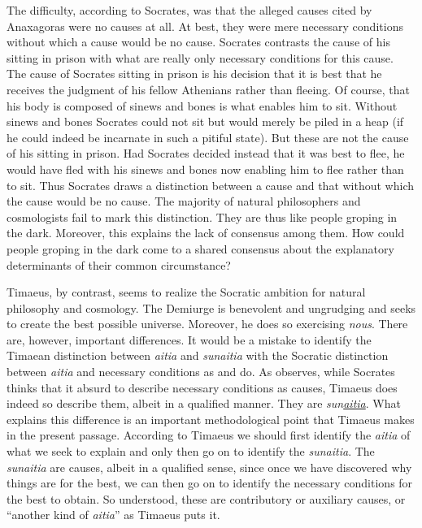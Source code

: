 The difficulty, according to Socrates, was that the alleged causes cited by Anaxagoras were no causes at all. At best, they were mere necessary conditions without which a cause would be no cause. Socrates contrasts the cause of his sitting in prison with what are really only necessary conditions for this cause. The cause of Socrates sitting in prison is his decision that it is best that he receives the judgment of his fellow Athenians rather than fleeing. Of course, that his body is composed of sinews and bones is what enables him to sit. Without sinews and bones Socrates could not sit but would merely be piled in a heap (if he could indeed be incarnate in such a pitiful state). But these are not the cause of his sitting in prison. Had Socrates decided instead that it was best to flee, he would have fled with his sinews and bones now enabling him to flee rather than to sit. Thus Socrates draws a distinction between a cause and that without which the cause would be no cause. The majority of natural philosophers and cosmologists fail to mark this distinction. They are thus like people groping in the dark. Moreover, this explains the lack of consensus among them. How could people groping in the dark come to a shared consensus about the explanatory determinants of their common circumstance?

Timaeus, by contrast, seems to realize the Socratic ambition for natural philosophy and cosmology. The Demiurge is benevolent and ungrudging and seeks to create the best possible universe. Moreover, he does so exercising \emph{nous}. There are, however, important differences. It would be a mistake to identify the Timaean distinction between \emph{aitia} and \emph{sunaitia} with the Socratic distinction between \emph{aitia} and necessary conditions as \citet[106]{Burnet:1911aa} and \citet[303]{Taylor:1928qb} do. As \citet[104]{Johansen:2004dx} observes, while Socrates thinks that it absurd to describe necessary conditions as causes, Timaeus does indeed so describe them, albeit in a qualified manner. They are \emph{sun\underline{aitia}}. What explains this difference is an important methodological point that Timaeus makes in the present passage. According to Timaeus we should first identify the \emph{aitia} of what we seek to explain and only then go on to identify the \emph{sunaitia}. The \emph{sunaitia} are causes, albeit in a qualified sense, since once we have discovered why things are for the best, we can then go on to identify the necessary conditions for the best to obtain. So understood, these are contributory or auxiliary causes, or ``another kind of \emph{aitia}'' as Timaeus puts it. 

